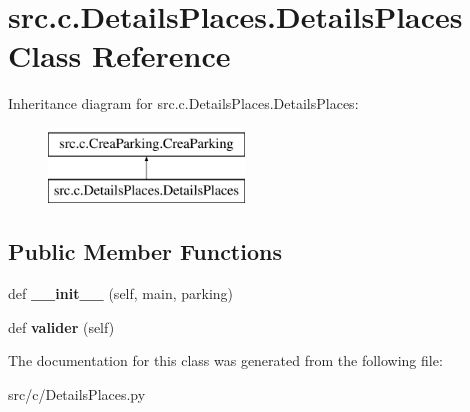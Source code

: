 \hypertarget{classsrc_1_1c_1_1_details_places_1_1_details_places}{}\section{src.\+c.\+Details\+Places.\+Details\+Places Class Reference}
\label{classsrc_1_1c_1_1_details_places_1_1_details_places}
Inheritance diagram for src.\+c.\+Details\+Places.\+Details\+Places\+:\begin{figure}[H]
\begin{center}
\leavevmode
\includegraphics[height=2.000000cm]{classsrc_1_1c_1_1_details_places_1_1_details_places}
\end{center}
\end{figure}
\subsection*{Public Member Functions}
\begin{DoxyCompactItemize}
\item 
\hypertarget{classsrc_1_1c_1_1_details_places_1_1_details_places_a62ec83d0ec4f8ca7c4be507e82320254}{}def {\bfseries \+\_\+\+\_\+init\+\_\+\+\_\+} (self, main, parking)\label{classsrc_1_1c_1_1_details_places_1_1_details_places_a62ec83d0ec4f8ca7c4be507e82320254}

\item 
\hypertarget{classsrc_1_1c_1_1_details_places_1_1_details_places_ad38dc568046dfa5c44bf9109edbceb6b}{}def {\bfseries valider} (self)\label{classsrc_1_1c_1_1_details_places_1_1_details_places_ad38dc568046dfa5c44bf9109edbceb6b}

\end{DoxyCompactItemize}


The documentation for this class was generated from the following file\+:\begin{DoxyCompactItemize}
\item 
src/c/Details\+Places.\+py\end{DoxyCompactItemize}
